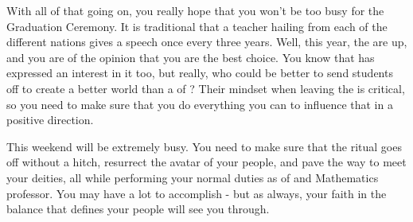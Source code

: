 \documentclass[char]{GL2020}
\begin{document}
With all of that going on, you really hope that you won’t be too busy for the Graduation Ceremony. It is traditional that a teacher hailing from each of the different nations gives a speech once every three years. Well, this year, the \pShip{} are up, and you are of the opinion that you are the best choice. You know that \cPirate{} has expressed an interest in it too, but really, who could be better to send students off to create a better world than a \cFlowPriest{\cleric} of \cFlow{\full}? Their mindset when leaving the \pSc{} is critical, so you need to make sure that you do everything you can to influence that in a positive direction.

This weekend will be extremely busy. You need to make sure that the ritual goes off without a hitch, resurrect the avatar of your people, and pave the way to meet your deities, all while performing your normal duties as \cFlowPriest{\cleric} of \cFlow{} and Mathematics professor. You may have a lot to accomplish - but as always, your faith in the balance that defines your people will see you through. 




\end{document}
